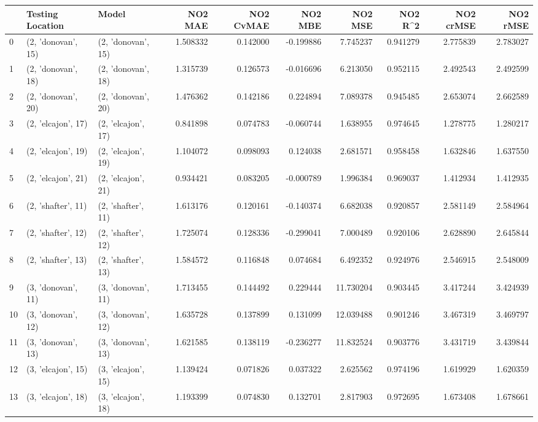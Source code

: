 \begin{tabular}{lllrrrrrrr}
\toprule
{} &    Testing Location &               Model &   NO2 MAE &  NO2 CvMAE &   NO2 MBE &    NO2 MSE &   NO2 R\textasciicircum2 &  NO2 crMSE &  NO2 rMSE \\
\midrule
0  &  (2, 'donovan', 15) &  (2, 'donovan', 15) &  1.508332 &   0.142000 & -0.199886 &   7.745237 &  0.941279 &   2.775839 &  2.783027 \\
1  &  (2, 'donovan', 18) &  (2, 'donovan', 18) &  1.315739 &   0.126573 & -0.016696 &   6.213050 &  0.952115 &   2.492543 &  2.492599 \\
2  &  (2, 'donovan', 20) &  (2, 'donovan', 20) &  1.476362 &   0.142186 &  0.224894 &   7.089378 &  0.945485 &   2.653074 &  2.662589 \\
3  &  (2, 'elcajon', 17) &  (2, 'elcajon', 17) &  0.841898 &   0.074783 & -0.060744 &   1.638955 &  0.974645 &   1.278775 &  1.280217 \\
4  &  (2, 'elcajon', 19) &  (2, 'elcajon', 19) &  1.104072 &   0.098093 &  0.124038 &   2.681571 &  0.958458 &   1.632846 &  1.637550 \\
5  &  (2, 'elcajon', 21) &  (2, 'elcajon', 21) &  0.934421 &   0.083205 & -0.000789 &   1.996384 &  0.969037 &   1.412934 &  1.412935 \\
6  &  (2, 'shafter', 11) &  (2, 'shafter', 11) &  1.613176 &   0.120161 & -0.140374 &   6.682038 &  0.920857 &   2.581149 &  2.584964 \\
7  &  (2, 'shafter', 12) &  (2, 'shafter', 12) &  1.725074 &   0.128336 & -0.299041 &   7.000489 &  0.920106 &   2.628890 &  2.645844 \\
8  &  (2, 'shafter', 13) &  (2, 'shafter', 13) &  1.584572 &   0.116848 &  0.074684 &   6.492352 &  0.924976 &   2.546915 &  2.548009 \\
9  &  (3, 'donovan', 11) &  (3, 'donovan', 11) &  1.713455 &   0.144492 &  0.229444 &  11.730204 &  0.903445 &   3.417244 &  3.424939 \\
10 &  (3, 'donovan', 12) &  (3, 'donovan', 12) &  1.635728 &   0.137899 &  0.131099 &  12.039488 &  0.901246 &   3.467319 &  3.469797 \\
11 &  (3, 'donovan', 13) &  (3, 'donovan', 13) &  1.621585 &   0.138119 & -0.236277 &  11.832524 &  0.903776 &   3.431719 &  3.439844 \\
12 &  (3, 'elcajon', 15) &  (3, 'elcajon', 15) &  1.139424 &   0.071826 &  0.037322 &   2.625562 &  0.974196 &   1.619929 &  1.620359 \\
13 &  (3, 'elcajon', 18) &  (3, 'elcajon', 18) &  1.193399 &   0.074830 &  0.132701 &   2.817903 &  0.972695 &   1.673408 &  1.678661 \\

\end{tabular}
